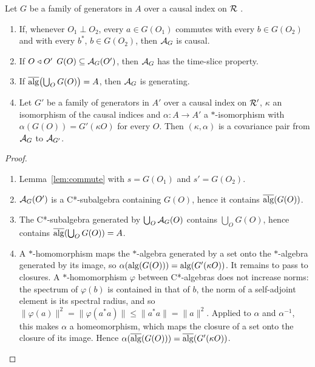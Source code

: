 \begin{proposition}\label{prop:generated}
Let $G$ be a family of generators in  $A$ over a causal index on  $\mathcal R$ .
\begin{enumerate}[label=(\alph*),leftmargin=2.5em]
\item If, whenever $O_1\perp O_2$, every $a\in G(O_1)$ commutes with every $b\in G(O_2)$ and
with every $b^*$, $b\in G(O_2)$, then $\mathcal A_G$ is causal.
\item If $O\mathrel{\triangleleft} O'$\revf{,} $G(O)\subseteq\mathcal A_G(O')$, then $\mathcal A_G$ has the time-slice
property.
\item If $\overline{\operatorname{alg}}\bigl(\bigcup_OG(O)\bigr)=A$, then $\mathcal A_G$ is generating.
\item Let $G'$ be a family of generators in $A'$ over a causal index on $\mathcal R'$, $\kappa$ an
isomorphism of the causal indices and $\alpha:A\to A'$ a $*$-isomorphism with
$\alpha(G(O))=G'(\kappa O)$ for every $O$. Then $(\kappa,\alpha)$ is a covariance pair from
$\mathcal A_G$ to $\mathcal A_{G'}$.
\end{enumerate}
\end{proposition}
\begin{proof}
\begin{enumerate}[leftmargin=2.5em]
\item[(a)] Lemma~\ref{lem:commute} with $s=G(O_1)$ and $s'=G(O_2)$.
\item[(b)] $\mathcal A_G(O')$ is a C*-subalgebra containing $G(O)$, hence it contains $\overline{\operatorname{alg}}(G(O))$.
\item[(c)] The C*-subalgebra generated by $\bigcup_O\mathcal A_G(O)$ contains $\bigcup_OG(O)$, hence
contains $\overline{\operatorname{alg}}(\bigcup_OG(O))=A$.
\item[(d)] A $*$-homomorphism maps the $*$-algebra generated by a set onto the $*$-algebra generated
by its image, so $\alpha(\operatorname{alg}(G(O)))=\operatorname{alg}(G'(\kappa O))$. It remains to pass to closures. A
$*$-homomorphism $\varphi$ between C*-algebras does not increase norms: the spectrum of
$\varphi(b)$ is contained in that of $b$, the norm of a self-adjoint element is its spectral
radius, and so $\|\varphi(a)\|^2=\|\varphi(a^*a)\|\leq\|a^*a\|=\|a\|^2$. Applied to $\alpha$ and
$\alpha^{-1}$, this makes $\alpha$ a homeomorphism, which maps the closure of a set onto the
closure of its image. Hence $\alpha(\overline{\operatorname{alg}}(G(O)))=\overline{\operatorname{alg}}(G'(\kappa O))$.
\end{enumerate}
\end{proof}

